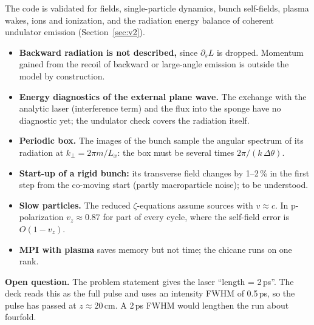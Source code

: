 \documentclass[11pt,a4paper]{article}
\begin{document}
The code is validated for fields, single-particle dynamics, bunch self-fields, plasma wakes, ions and ionization, and the radiation energy balance of coherent undulator emission (Section~\ref{sec:v2}).
\begin{itemize}
\item \textbf{Backward radiation is not described,} since $\partial_s L$ is dropped. Momentum gained from the recoil of backward or large-angle emission is outside the model by construction.
\item \textbf{Energy diagnostics of the external plane wave.} The exchange with the analytic laser (interference term) and the flux into the sponge have no diagnostic yet; the undulator check covers the radiation itself.
\item \textbf{Periodic box.} The images of the bunch sample the angular spectrum of its radiation at $k_\perp=2\pi m/L_x$: the box must be several times $2\pi/(k\,\Delta\theta)$.
\item \textbf{Start-up of a rigid bunch:} its transverse field changes by 1--2\,\% in the first step from the co-moving start (partly macroparticle noise); to be understood.
\item \textbf{Slow particles.} The reduced $\zeta$-equations assume sources with $v\approx c$. In p-polarization $v_z\approx0.87$ for part of every cycle, where the self-field error is $O(1-v_z)$.
\item \textbf{MPI with plasma} saves memory but not time; the chicane runs on one rank.
\end{itemize}

\textbf{Open question.} The problem statement gives the laser ``length = 2\,ps''. The deck reads this as the full pulse and uses an intensity FWHM of 0.5\,ps, so the pulse has passed at $z\approx20$\,cm. A 2\,ps FWHM would lengthen the run about fourfold.
\end{document}
